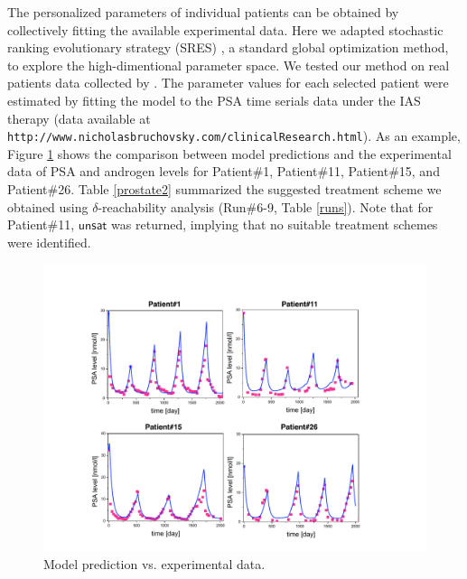 The personalized parameters of individual patients can be obtained by collectively fitting the available experimental data. Here we adapted stochastic ranking evolutionary strategy (SRES) \cite{sres}, a standard global optimization method, to explore the high-dimentional parameter space. %
%
We tested our method on real patients data collected by \cite{bruchovsky07}. The parameter values for each selected patient were estimated by fitting the model to the PSA time serials data under the IAS therapy (data available at \verb#http://www.nicholasbruchovsky.com/clinicalResearch.html#). As an example, Figure \ref{fitting} shows the comparison between model predictions and the experimental data of PSA and androgen levels for Patient\#1, Patient\#11, Patient\#15, and Patient\#26. Table \ref{prostate2} summarized the suggested treatment scheme we obtained using $\delta$-reachability analysis (Run\#6-9, Table \ref{runs}). Note that for Patient\#11, $\mathsf{unsat}$ was returned, implying that no suitable treatment schemes were identified.


\begin{figure}[htb]
\centering
\includegraphics[scale=0.48]{fig-fitting}
\caption{Model prediction vs. experimental data.}
\label{fitting}
\end{figure}







